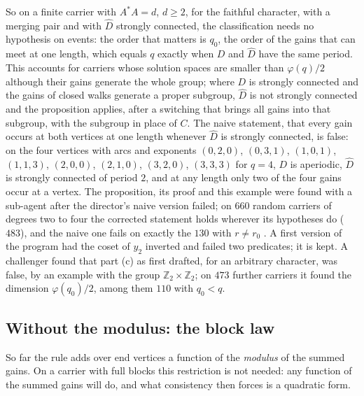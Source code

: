 So on a finite carrier with $A^*A=d$, $d\ge2$, for the faithful character, with a merging pair and with $\hat D$ strongly connected, the classification needs no hypothesis on events: the order that matters is $q_0$, the order of the gains that can meet at one length, which equals $q$ exactly when $D$ and $\hat D$ have the same period. This accounts for carriers whose solution spaces are smaller than $\varphi(q)/2$ although their gains generate the whole group; where $D$ is strongly connected and the gains of closed walks generate a proper subgroup, $\hat D$ is not strongly connected and the proposition applies, after a switching that brings all gains into that subgroup, with the subgroup in place of $C$. The naive statement, that every gain occurs at both vertices at one length whenever $\hat D$ is strongly connected, is false: on the four vertices with arcs and exponents $(0,2,0)$, $(0,3,1)$, $(1,0,1)$, $(1,1,3)$, $(2,0,0)$, $(2,1,0)$, $(3,2,0)$, $(3,3,3)$ for $q=4$, $D$ is aperiodic, $\hat D$ is strongly connected of period $2$, and at any length only two of the four gains occur at a vertex. The proposition, its proof and this example were found with a sub-agent after the director's naive version failed; on $660$ random carriers of degrees two to four the corrected statement holds wherever its hypotheses do ($483$), and the naive one fails on exactly the $130$ with $r\ne r_0$ \cite{comp4s}. A first version of the program had the coset of $y_2$ inverted and failed two predicates; it is kept. A challenger found that part (c) as first drafted, for an arbitrary character, was false, by an example with the group $\mathbb{Z}_2\times\mathbb{Z}_2$; on $473$ further carriers it found the dimension $\varphi(q_0)/2$, among them $110$ with $q_0<q$.

\subsection{Without the modulus: the block law}
So far the rule adds over end vertices a function of the \emph{modulus} of the summed gains. On a carrier with full blocks this restriction is not needed: any function of the summed gains will do, and what consistency then forces is a quadratic form.

